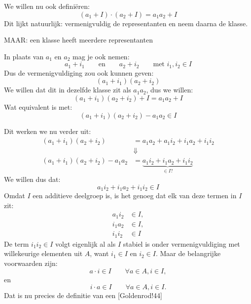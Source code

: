 
We willen nu ook definiëren:
\begin{equation*}
    (a_1 + I) \cdot (a_2 + I) = a_1a_2 + I
\end{equation*}
Dit lijkt natuurlijk: vermenigvuldig de representanten en neem daarna de klasse.

 MAAR: een klasse heeft meerdere representanten 

In plaats van $a_1$ en $a_2$ mag je ook nemen:
\begin{equation*}
    a_1 + i_1 \qquad \text{en} \qquad a_2 + i_2 \qquad \text{met } i_1,i_2 \in I
\end{equation*}
Dus de vermenigvuldiging zou ook kunnen geven:
\begin{equation*}
    (a_1 + i_1)(a_2 + i_2)
\end{equation*}
We willen dat dit in dezelfde klasse zit als $a_1a_2$, dus we willen:
\begin{equation*}
    (a_1 + i_1)(a_2 + i_2) + I = a_1a_2 + I
\end{equation*}
Wat equivalent is met:
\begin{equation*}
    (a_1 + i_1)(a_2 + i_2) - a_1a_2 \in I
\end{equation*}

Dit werken we nu verder uit:
\begin{equation*}
    \begin{aligned}
        (a_1 + i_1)(a_2 + i_2) &= a_1a_2 + a_1i_2 + i_1a_2 + i_1i_2 \\
        &\Downarrow \\
        (a_1 + i_1)(a_2 + i_2) - a_1a_2 &= \underbrace{a_1i_2 + i_1a_2 + i_1i_2}_{\in I ?}
    \end{aligned}
\end{equation*}
We willen dus dat:
\begin{equation*}
    a_1i_2 + i_1a_2 + i_1i_2 \in I
\end{equation*}
Omdat $I$ een additieve deelgroep is, is het genoeg dat elk van deze termen in $I$ zit:
\begin{equation*}
    \begin{aligned}
        a_1i_2 &\in I,\\
        i_1a_2 &\in I,\\
        i_1i_2 &\in I
    \end{aligned}
\end{equation*}
De term $i_1i_2 \in I$ volgt eigenlijk al als $I$ stabiel is onder vermenigvuldiging met willekeurige elementen uit $A$, want $i_1 \in I$ en $i_2 \in I$. Maar de belangrijke voorwaarden zijn:
\begin{equation*}
    a \cdot i \in I \qquad \forall a \in A, i \in I,
\end{equation*}
en
\begin{equation*}
    i \cdot a \in I \qquad \forall a \in A, i \in I.
\end{equation*}
 Dat is nu precies de definitie van een [Goldenrod!44] 

